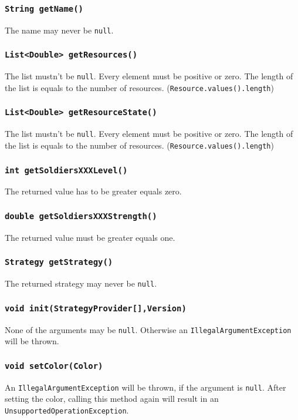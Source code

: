 \documentclass{article}
\begin{document}
\subsubsection{\texttt{String getName()}}
The name may never be \texttt{null}.

\subsubsection{\texttt{List<Double> getResources()}}
The list mustn't be \texttt{null}. Every element must be positive or zero.
The length of the list is equals to the number of resources. (\texttt{Resource.values().length})

\subsubsection{\texttt{List<Double> getResourceState()}}
The list mustn't be \texttt{null}. Every element must be positive or zero.
The length of the list is equals to the number of resources. (\texttt{Resource.values().length})

\subsubsection{\texttt{int getSoldiersXXXLevel()}}
The returned value has to be greater equals zero.

\subsubsection{\texttt{double getSoldiersXXXStrength()}}
The returned value must be greater equals one.

\subsubsection{\texttt{Strategy getStrategy()}}
The returned strategy may never be \texttt{null}.

\subsubsection{\texttt{void init(StrategyProvider[],Version)}}
None of the arguments may be \texttt{null}. Otherwise an \texttt{IllegalArgumentException} will be thrown.

\subsubsection{\texttt{void setColor(Color)}}
An \texttt{IllegalArgumentException} will be thrown, if the argument is \texttt{null}.
After setting the color, calling this method again will result in an \texttt{UnsupportedOperationException}.
\end{document}
